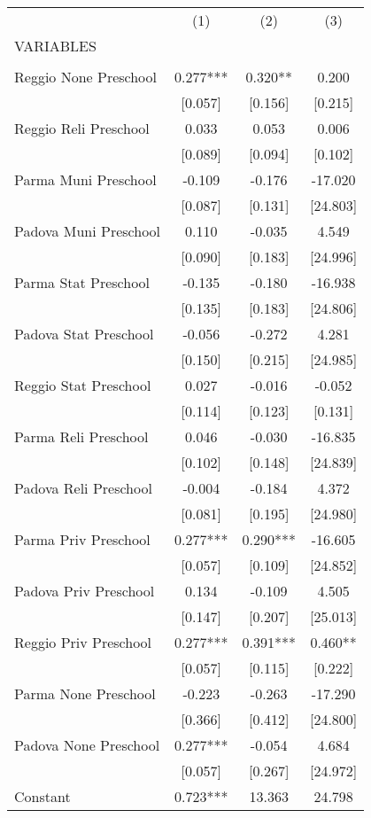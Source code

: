 \begin{tabular}{lccc} \hline
 & (1) & (2) & (3) \\
VARIABLES &  &  &  \\ \hline
 &  &  &  \\
Reggio None Preschool & 0.277*** & 0.320** & 0.200 \\
 & [0.057] & [0.156] & [0.215] \\
Reggio Reli Preschool & 0.033 & 0.053 & 0.006 \\
 & [0.089] & [0.094] & [0.102] \\
Parma Muni Preschool & -0.109 & -0.176 & -17.020 \\
 & [0.087] & [0.131] & [24.803] \\
Padova Muni Preschool & 0.110 & -0.035 & 4.549 \\
 & [0.090] & [0.183] & [24.996] \\
Parma Stat Preschool & -0.135 & -0.180 & -16.938 \\
 & [0.135] & [0.183] & [24.806] \\
Padova Stat Preschool & -0.056 & -0.272 & 4.281 \\
 & [0.150] & [0.215] & [24.985] \\
Reggio Stat Preschool & 0.027 & -0.016 & -0.052 \\
 & [0.114] & [0.123] & [0.131] \\
Parma Reli Preschool & 0.046 & -0.030 & -16.835 \\
 & [0.102] & [0.148] & [24.839] \\
Padova Reli Preschool & -0.004 & -0.184 & 4.372 \\
 & [0.081] & [0.195] & [24.980] \\
Parma Priv Preschool & 0.277*** & 0.290*** & -16.605 \\
 & [0.057] & [0.109] & [24.852] \\
Padova Priv Preschool & 0.134 & -0.109 & 4.505 \\
 & [0.147] & [0.207] & [25.013] \\
Reggio Priv Preschool & 0.277*** & 0.391*** & 0.460** \\
 & [0.057] & [0.115] & [0.222] \\
Parma None Preschool & -0.223 & -0.263 & -17.290 \\
 & [0.366] & [0.412] & [24.800] \\
Padova None Preschool & 0.277*** & -0.054 & 4.684 \\
 & [0.057] & [0.267] & [24.972] \\
Constant & 0.723*** & 13.363 & 24.798 \\

\end{tabular}
